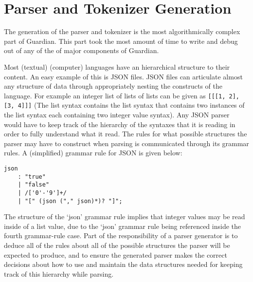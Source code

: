 
\section{Parser and Tokenizer Generation}
{
	The generation of the parser and tokenizer is the most
	algorithmically complex part of Guardian.
	This part took the most amount of time to write
	and debug out of any of the of major components of Guardian.
	
	Most (textual) (computer) languages have an hierarchical structure to
	their content. An easy example of this is JSON files. JSON files
	can articulate almost any structure of data through appropriately
	nesting the constructs of the language. For example an
	integer list of lists of lists can be
	given as \texttt{[[[1, 2], [3, 4]]]} (The list syntax contains the list
	syntax that contains two instances of the list syntax each containing two
	integer value syntax). Any JSON parser would have to
	keep track of the hierarchy of the syntaxes that it is reading
	in order to fully
	understand what it read. The rules for what possible structures the
	parser may have to construct when parsing is communicated
	through its grammar rules. A (simplified) grammar rule for
	JSON is given below:
\begin{lstlisting}[texcl=true, language=MAIA]
json
	: "true"
	| "false"
	| /['0'-'9']+/
	| "[" (json ("," json)*)? "]";
\end{lstlisting}
	The structure of the `json' grammar rule implies that integer values
	may be read inside of a list value, due to the `json' grammar rule
	being referenced inside the fourth grammar-rule case.
	Part of the responsibility of a parser generator is to deduce all of the
	rules about all of the possible structures the parser will be expected
	to produce, and to ensure the generated parser
	makes the correct decisions about how to use and maintain the data
	structures needed for keeping track of this hierarchy while parsing.
	
}
